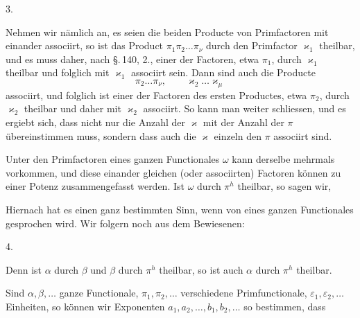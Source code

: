 3. 

Nehmen wir nämlich an, es seien die beiden Producte von Primfactoren
mit einander associirt, so ist das Product $\pi_1 \pi_2 \ldots \pi_\nu$ durch den Primfactor $\varkappa_1$ theilbar, und es muss daher, nach \S.\,140, 2., einer der Factoren, etwa $\pi_1$, durch $\varkappa_1$ theilbar und folglich mit $\varkappa_1$ associirt sein. Dann sind auch die Producte
\[
\pi_2 \ldots \pi_\nu, \qquad \varkappa_2 \ldots \varkappa_\mu
\]
associirt, und folglich ist einer der Factoren des ersten Productes, etwa $\pi_2$, durch $\varkappa_2$ theilbar und daher mit $\varkappa_2$ associirt. So kann man weiter schliessen, und es ergiebt sich, dass nicht nur die Anzahl der $\varkappa$ mit der Anzahl der $\pi$ übereinstimmen muss, sondern dass auch die $\varkappa$ einzeln den $\pi$ associirt sind.

Unter den Primfactoren eines ganzen Functionales $\omega$ kann derselbe mehrmals vorkommen, und diese einander gleichen (oder associirten) Factoren können zu einer Potenz zusammengefasst werden. Ist $\omega$ durch $\pi^h$ theilbar, so sagen wir, 

Hiernach hat es einen ganz bestimmten Sinn, wenn von  eines ganzen Functionales gesprochen wird. Wir folgern noch aus dem Bewiesenen:

4. 

Denn ist $\alpha$ durch $\beta$ und $\beta$ durch $\pi^h$ theilbar, so ist auch $\alpha$ durch $\pi^h$ theilbar.

Sind $\alpha, \beta, \ldots$ ganze Functionale, $\pi_1, \pi_2, \ldots$ verschiedene Primfunctionale, $\varepsilon_1, \varepsilon_2, \ldots$ Einheiten, so können wir Exponenten $a_1, a_2, \ldots, b_1, b_2, \ldots$ so bestimmen, dass
